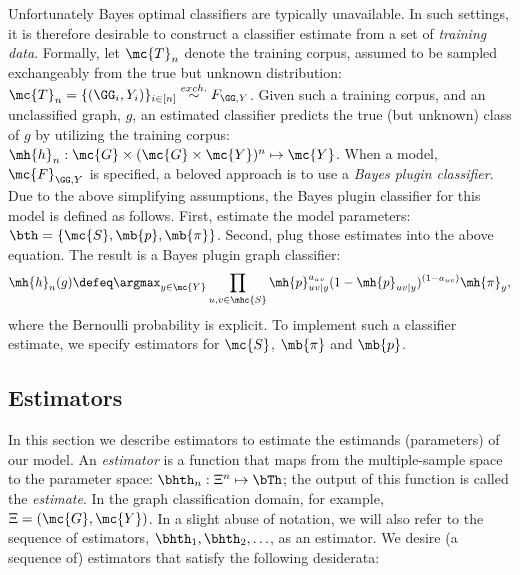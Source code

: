 \documentclass[10pt,journal,cspaper,compsoc]{IEEEtran}
\begin{document}
Unfortunately Bayes optimal classifiers are typically unavailable. In such settings, it is therefore desirable to construct a classifier estimate from a set of \emph{training data}. Formally, let $\mc{T}_n$ denote the training corpus, assumed to be sampled exchangeably from the true but unknown distribution: $\mc{T}_n=\{(\GG_i,Y_i)\}_{i \in [n]} \overset{exch.}{\sim} F_{\GG, Y}$.  Given such a training corpus, and an unclassified graph, $g$, an estimated classifier predicts the true (but unknown) class of $g$ by utilizing the training corpus: $\mh{h}_n: \mc{G} \times (\mc{G} \times \mc{Y})^n \mapsto \mc{Y}$.  When a model, $\mc{F}_{\GG,Y}$ is specified, a beloved approach is to use a  \emph{Bayes plugin classifier}. Due to the above simplifying assumptions, the Bayes plugin classifier for this model is defined as follows.  First, estimate the  model parameters: $\bth=\{\mc{S}, \mb{p}, \mb{\pi}\}$. Second, plug those estimates into the above equation.  The result is a Bayes plugin graph classifier:
\begin{align}
\mh{h}_n(g) \defeq  \argmax_{y \in \mc{Y}} \prod_{u,v \in \mhc{S}}
\mh{p}_{uv|y}^{a_{uv}}(1-\mh{p}_{uv|y})^{(1-a_{uv})} \mh{\pi}_y,
\end{align}
where the Bernoulli probability is explicit. To implement such a classifier estimate, we specify estimators for $\mc{S}$, $\mb{\pi}$ and $\mb{p}$.


\subsection{Estimators} %
\label{sub:estimators}


In this section we describe estimators to estimate the estimands (parameters) of our model.  An \emph{estimator} is a function that maps from the multiple-sample space to the parameter space: $\bhth_n: \Xi^n \mapsto \bTh$; the output of this function is called the \emph{estimate}.  In the graph classification domain, for example, $\Xi=(\mc{G},\mc{Y})$.  In a slight abuse of notation, we will also refer to the sequence of estimators, $\bhth_1,\bhth_2, \ldots$, as an estimator.  We desire (a sequence of) estimators that satisfy the following desiderata:
\end{document}
